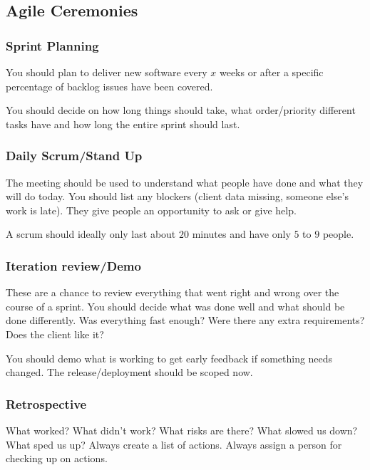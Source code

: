 \subsection{Agile Ceremonies}\label{sub:agile_ceremonies}

\subsubsection{Sprint Planning}\label{ssub:sprint_planning}

You should plan to deliver new software every \(x\) weeks or after a specific percentage of backlog issues have been covered.

You should decide on how long things should take, what order/priority different tasks have and how long the entire sprint should last.

\subsubsection{Daily Scrum/Stand Up}\label{ssub:daily_scrum_stand_up}

The meeting should be used to understand what people have done and what they will do today.
You should list any blockers (client data missing, someone else's work is late).
They give people an opportunity to ask or give help.

A scrum should ideally only last about \(20\) minutes and have only \(5\) to \(9\) people.

\subsubsection{Iteration review/Demo}\label{ssub:iteration_review_demo}

These are a chance to review everything that went right and wrong over the course of a sprint.
You should decide what was done well and what should be done differently.
Was everything fast enough?
Were there any extra requirements?
Does the client like it?

You should demo what is working to get early feedback if something needs changed.
The release/deployment should be scoped now.

\subsubsection{Retrospective}\label{ssub:retrospective}

What worked?
What didn't work?
What risks are there?
What slowed us down?
What sped us up?
Always create a list of actions.
Always assign a person for checking up on actions.

